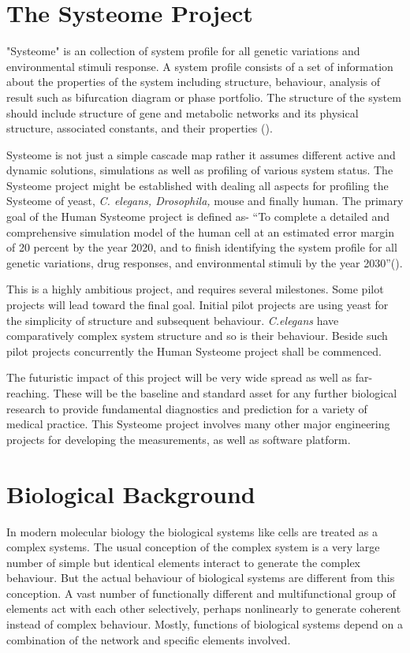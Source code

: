 \section{The Systeome Project}
"Systeome" is an collection of system profile for all genetic variations and environmental stimuli response. A system profile consists of a set of information about the properties of the system including structure, behaviour, analysis of result such as bifurcation diagram or phase portfolio. The structure of the system should include structure of gene and metabolic networks and its physical structure, associated constants, and their properties (\cite{Kitano:2002}).

Systeome is not just a simple cascade map rather it assumes different active and dynamic solutions, simulations as well as profiling of various system status. The Systeome project might be established with dealing all aspects for profiling the Systeome of yeast, \textit{C. elegans, Drosophila,} mouse and finally human. The primary goal of the Human Systeome project is defined as- ``To complete a detailed and comprehensive simulation model of the human cell at an estimated error margin of 20 percent by the year 2020, and to finish identifying the system profile for all genetic variations, drug responses, and environmental stimuli by the year 2030''(\cite{Kitano:2002}).

This is a highly ambitious project, and requires several milestones. Some pilot projects will lead toward the final goal. Initial pilot projects are using yeast for the simplicity of structure and subsequent behaviour. \textit{C.elegans} have comparatively complex system structure and so is their behaviour. Beside such pilot projects concurrently the Human Systeome project shall be commenced.

The futuristic impact of this project will be very wide spread as well as far-reaching. These will be the baseline and standard asset for any further biological research to provide fundamental diagnostics and prediction for a variety of medical practice. This Systeome project involves many other major engineering projects for developing the measurements, as well as software platform.

\section{Biological Background}
In modern molecular biology the biological systems like cells are treated as a complex systems. The usual conception of the complex system is a very large number of simple but identical elements interact to generate the complex behaviour. But the actual behaviour of biological systems are different from this conception. A vast number of functionally different and multifunctional group of elements act with each other selectively, perhaps nonlinearly to generate coherent instead of complex behaviour. Mostly, functions of biological systems depend on a combination of the network and specific elements involved. 

